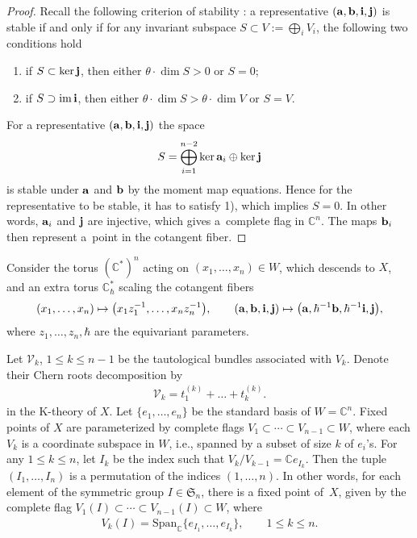 \documentclass[10pt,a4paper]{amsart}
\def\C{{\mathbb C}}
\newcommand{\cV}{\mathcal{V}}
\numberwithin{equation}{section}
\begin{document}
\begin{proof} Recall the following criterion of stability \cite{Intro}: a representative $({\bf a, b, i, j})$ is stable if and only if for any invariant subspace $S\subset V := \bigoplus_i V_i$, the following two conditions hold
\begin{enumerate}\itemsep=0pt
\item[1)] if $S \subset \ker {\bf j}$, then either $\theta \cdot \dim S >0$ or $S = 0$;
\item[2)] if $S \supset \operatorname{im} {\bf i}$, then either $\theta \cdot \dim S > \theta \cdot \dim V$ or $S = V$.
\end{enumerate}
For a representative $({\bf a, b, i, j})$ the space
 \begin{gather*}
 S = \bigoplus_{i=1}^{n-2} \ker {\bf a}_i \oplus \ker {\bf j}
 \end{gather*}
is stable under ${\bf a}$ and ${\bf b}$ by the moment map equations. Hence for the representative to be stable, it has to satisfy 1), which implies $S = 0$. In other words, ${\bf a}_i$ and ${\bf j}$ are injective, which gives a~complete flag in $\C^n$. The maps ${\bf b}_i$ then represent a~point in the cotangent fiber.
\end{proof}

Consider the torus $(\C^*)^n$ acting on $(x_1, \dots, x_n) \in W$, which descends to $X$, and an extra torus $\C^*_\hbar$ scaling the cotangent fibers{\samepage
\begin{gather*}
(x_1, \dots, x_n) \mapsto \big(x_1 z_1^{-1}, \dots, x_n z_n^{-1}\big), \qquad ({\bf a, b, i, j}) \mapsto \big({\bf a}, \hbar^{-1} {\bf b}, \hbar^{-1} {\bf i}, {\bf j} \big) ,
\end{gather*}
where $z_1, \dots, z_n, \hbar$ are the equivariant parameters.}

Let $\cV_k$, $1\leq k\leq n-1$ be the tautological bundles associated with $V_k$. Denote their Chern roots decomposition by
\begin{gather*}
\cV_k = t_1^{(k)} + \dots + t_k^{(k)}.
\end{gather*}
in the K-theory of $X$. Let $\{e_1, \dots, e_n\}$ be the standard basis of $W = \C^n$. Fixed points of $X$ are parameterized by complete flags $V_1 \subset \cdots \subset V_{n-1} \subset W$, where each $V_k$ is a coordinate subspace in $W$, i.e., spanned by a subset of size $k$ of $e_i$'s. For any $1\leq k\leq n$, let $I_k$ be the index such that $V_k / V_{k-1} = \C e_{I_k}$. Then the tuple $(I_1, \dots, I_n)$ is a permutation of the indices $(1, \dots, n)$. In other words, for each element of the symmetric group $I\in \mathfrak{S}_n$, there is a fixed point of~$X$, given by the complete flag $V_1 (I) \subset \cdots \subset V_{n-1} (I) \subset W$, where
\begin{gather*}
V_k (I) = \mathrm{Span}_\C \{e_{I_1}, \dots, e_{I_k} \}, \qquad 1\leq k\leq n.
\end{gather*}
\end{document}
